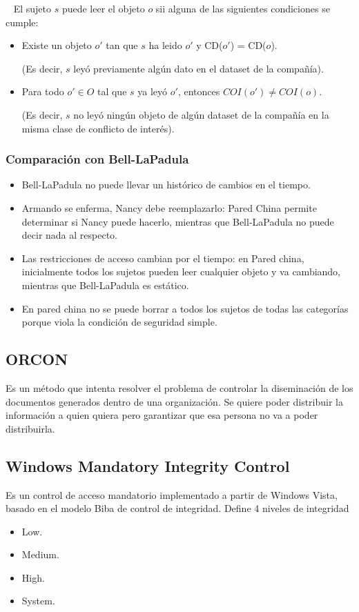 \documentclass[]{article}
\begin{document}
~\newline
El sujeto $s$ puede leer el objeto $o$ sii alguna de las siguientes condiciones se cumple:
\begin{itemize}
	\item Existe un objeto $o'$ tan que $s$ ha leido $o'$ y CD($o'$) = CD($o$).

	(Es decir, $s$ leyó previamente algún dato en el dataset de la compañía).
	\item Para todo $o'\in O$ tal que $s$ ya leyó $o'$, entonces $COI(o')\neq COI(o)$.

	(Es decir, $s$ no leyó ningún objeto de algún dataset de la compañía en la misma clase de conflicto de interés).
\end{itemize}

\subsubsection{Comparación con Bell-LaPadula}
\begin{itemize}
	\item Bell-LaPadula no puede llevar un histórico de cambios en el tiempo.
	\item Armando se enferma, Nancy debe reemplazarlo: Pared China permite determinar si Nancy puede hacerlo, mientras que Bell-LaPadula no puede decir nada al respecto.
	\item Las restricciones de acceso cambian por el tiempo: en Pared china, inicialmente todos los sujetos pueden leer cualquier objeto y va cambiando, mientras que Bell-LaPadula es estático.
	\item En pared china no se puede borrar a todos los sujetos de todas las categorías porque viola la condición de seguridad simple.
\end{itemize}

\subsection{ORCON}
Es un método que intenta resolver el problema de controlar la diseminación de los documentos generados dentro de una organización. Se quiere poder distribuir la información a quien quiera pero garantizar que esa persona no va a poder distribuirla.


\subsection{Windows Mandatory Integrity Control}
Es un control de acceso mandatorio implementado a partir de Windows Vista, basado en el modelo Biba de control de integridad. Define 4 niveles de integridad
\begin{itemize}
	\item Low.
	\item Medium.
	\item High.
	\item System.
\end{itemize}
\end{document}

